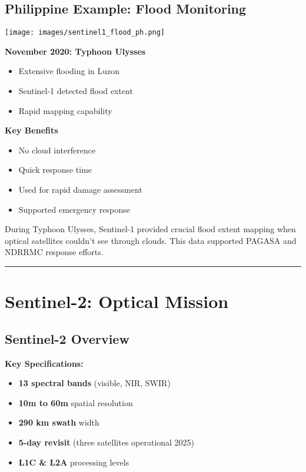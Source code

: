 \documentclass[
  letterpaper,
  DIV=11,
  numbers=noendperiod]{scrartcl}
\providecommand{\tightlist}{%
  \setlength{\itemsep}{0pt}\setlength{\parskip}{0pt}}
\begin{document}
\subsection{Philippine Example: Flood
Monitoring}\label{philippine-example-flood-monitoring}

\begin{center}
\texttt{[image: images/sentinel1\_flood\_ph.png]}
\end{center}

\textbf{November 2020: Typhoon Ulysses}

\begin{itemize}
\tightlist
\item
  Extensive flooding in Luzon
\item
  Sentinel-1 detected flood extent
\item
  Rapid mapping capability
\end{itemize}

\textbf{Key Benefits}

\begin{itemize}
\tightlist
\item
  No cloud interference
\item
  Quick response time
\item
  Used for rapid damage assessment
\item
  Supported emergency response
\end{itemize}

During Typhoon Ulysses, Sentinel-1 provided crucial flood extent mapping
when optical satellites couldn't see through clouds. This data supported
PAGASA and NDRRMC response efforts.

\begin{center}\rule{0.5\linewidth}{0.5pt}\end{center}

\section{Sentinel-2: Optical Mission}\label{sentinel-2-optical-mission}

\subsection{Sentinel-2 Overview}\label{sentinel-2-overview}

\textbf{Key Specifications:}

\begin{itemize}
\tightlist
\item
  \textbf{13 spectral bands} (visible, NIR, SWIR)
\item
  \textbf{10m to 60m} spatial resolution
\item
  \textbf{290 km swath} width
\item
  \textbf{5-day revisit} (three satellites operational 2025)
\item
  \textbf{L1C \& L2A} processing levels
\end{itemize}
\end{document}
